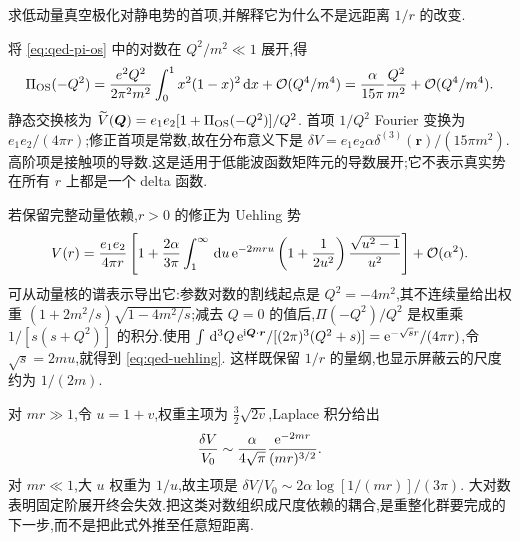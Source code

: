 \begin{example}
求低动量真空极化对静电势的首项,并解释它为什么不是远距离 $1/r$ 的改变.
\end{example}
\begin{solution}
将 \eqref{eq:qed-pi-os} 中的对数在 $Q^2/m^2\ll1$ 展开,得
\begin{equation}
 \Pi_{\rm OS}(-Q^2)=\frac{e^2Q^2}{2\pi^2m^2}
        \int_0^1x^2(1-x)^2\,\mathrm d x+\mathcal O(Q^4/m^4)
       =\frac\alpha{15\pi}\frac{Q^2}{m^2}+\mathcal O(Q^4/m^4).
\end{equation}
静态交换核为 $\widetilde V(\boldsymbol Q)
=e_1e_2[1+\Pi_{\rm OS}(-Q^2)]/Q^2$.
首项 $1/Q^2$ Fourier 变换为 $e_1e_2/(4\pi r)$;修正首项是常数,故在分布意义下是
$\delta V=e_1e_2\alpha\delta^{(3)}(\boldsymbol r)/(15\pi m^2)$.
高阶项是接触项的导数.这是适用于低能波函数矩阵元的导数展开;它不表示真实势在所有 $r$ 上都是一个 delta 函数.
\end{solution}

若保留完整动量依赖,$r>0$ 的修正为 Uehling 势
\begin{equation}
 V(r)=\frac{e_1e_2}{4\pi r}\left[1+
 \frac{2\alpha}{3\pi}\int_1^\infty\,\mathrm d u\,
 \mathrm e^{-2mru}\left(1+\frac1{2u^2}\right)
 \frac{\sqrt{u^2-1}}{u^2}\right]+\mathcal O(\alpha^2).
 \label{eq:qed-uehling}
\end{equation}
可从动量核的谱表示导出它:参数对数的割线起点是 $Q^2=-4m^2$,其不连续量给出权重
$(1+2m^2/s)\sqrt{1-4m^2/s}$;减去 $Q=0$ 的值后,$\Pi(-Q^2)/Q^2$ 是权重乘 $1/[s(s+Q^2)]$ 的积分.使用
$\int\,\mathrm d^3Q\,\mathrm e^{\mathrm i\boldsymbol Q\cdot\boldsymbol r}/[(2\pi)^3(Q^2+s)]
=\mathrm e^{-\sqrt s r}/(4\pi r)$,令 $\sqrt s=2mu$,就得到 \eqref{eq:qed-uehling}.
这样既保留 $1/r$ 的量纲,也显示屏蔽云的尺度约为 $1/(2m)$.

对 $mr\gg1$,令 $u=1+v$,权重主项为 $\tfrac32\sqrt{2v}$,Laplace 积分给出
\begin{equation}
 \frac{\delta V}{V_0}
 \sim\frac\alpha{4\sqrt\pi}\frac{\mathrm e^{-2mr}}{(mr)^{3/2}}.
\end{equation}
对 $mr\ll1$,大 $u$ 权重为 $1/u$,故主项是
$\delta V/V_0\sim 2\alpha\log[1/(mr)]/(3\pi)$.
大对数表明固定阶展开终会失效.把这类对数组织成尺度依赖的耦合,是重整化群要完成的下一步,而不是把此式外推至任意短距离.
